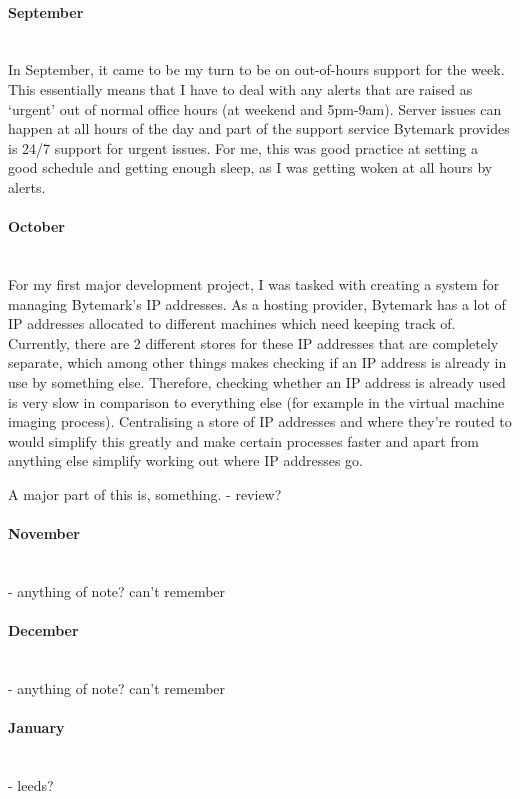 \documentclass[12pt,a4paper]{article}
\newcommand{\paragraphnl}[1]{\paragraph{#1}\mbox{}\\}
\begin{document}
\paragraphnl{September}
	In September, it came to be my turn to be on out-of-hours support for the
	week. This essentially means that I have to deal with any alerts that are
	raised as `urgent' out of normal office hours (at weekend and 5pm-9am).
	Server issues can happen at all hours of the day and part of the support
	service Bytemark provides is 24/7 support for urgent issues. For me, this
	was good practice at setting a good schedule and getting enough sleep, as I
	was getting woken at all hours by alerts.

\paragraphnl{October}
	For my first major development project, I was tasked with creating a system
	for managing Bytemark's IP addresses. As a hosting provider, Bytemark has a
	lot of IP addresses allocated to different machines which need keeping
	track of. Currently, there are 2 different stores for these IP addresses
	that are completely separate, which among other things makes checking if an
	IP address is already in use by something else. Therefore, checking whether
	an IP address is already used is very slow in comparison to everything else
	(for example in the virtual machine imaging process). Centralising a store
	of IP addresses and where they're routed to would simplify this greatly and
	make certain processes faster and apart from anything else simplify working
	out where IP addresses go.

	A major part of this is, something.
- review?
\paragraphnl{November}
- anything of note? can't remember
\paragraphnl{December}
- anything of note? can't remember
\paragraphnl{January}
- leeds?
\end{document}
